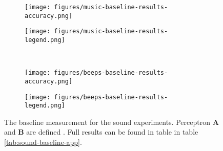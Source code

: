 \begin{figure}
    \centering
    \begin{subfigure}{0.5\linewidth}
        \centering
        \captionsetup{width = 0.9\linewidth}
        \texttt{[image: figures/music-baseline-results-accuracy.png]}
    \end{subfigure}%
    \begin{subfigure}{0.5\linewidth}
        \centering
        \captionsetup{width = 0.9\linewidth}
        \texttt{[image: figures/music-baseline-results-legend.png]}
    \end{subfigure}%
    \\
    \begin{subfigure}{0.5\linewidth}
        \centering
        \captionsetup{width = 0.9\linewidth}
        \texttt{[image: figures/beeps-baseline-results-accuracy.png]}
    \end{subfigure}%
    \begin{subfigure}{0.5\linewidth}
        \centering
        \captionsetup{width = 0.9\linewidth}
        \texttt{[image: figures/beeps-baseline-results-legend.png]}
    \end{subfigure}%
    \caption{The baseline measurement for the sound experiments. Perceptron \textbf{A} and \textbf{B} are defined . Full results can be found in table in table \ref{tab:sound-baseline-app}.}
    \label{fig:sound-baseline-results}
\end{figure}
